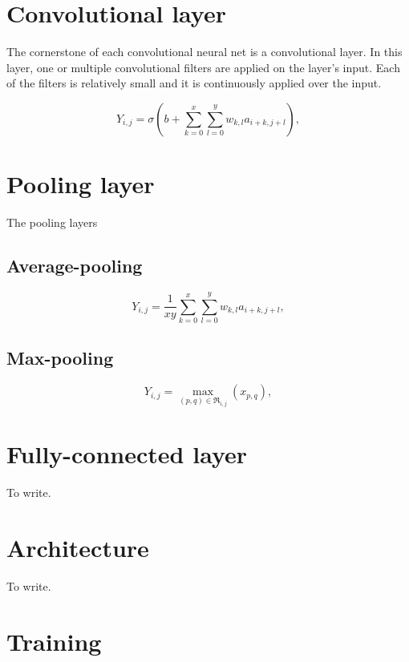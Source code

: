 \documentclass[twoside]{ctuthesis}
\theoremstyle{plain}
\theoremstyle{definition}
\theoremstyle{note}
\begin{document}
\section{Convolutional layer}
The cornerstone of each convolutional neural net is a convolutional layer. In this layer, 
one or multiple convolutional filters are applied on the layer's input.  Each of the filters
is relatively small and it is continuously applied over the input. 

\begin{equation} 
	Y_{i,j}=\sigma(b+\sum_{k=0}^{x}\sum_{l=0}^{y}w_{k,l}a_{i+k,j+l}),
\end{equation} 

\section{Pooling layer}
The pooling layers 

\subsection{Average-pooling}
\begin{equation} 
	Y_{i,j}=\frac{1}{xy}\sum_{k=0}^{x}\sum_{l=0}^{y}w_{k,l}a_{i+k,j+l},
\end{equation} 


\subsection{Max-pooling}

\begin{equation} 
	Y_{i,j} = \max_{(p,q)\in{\Re_{i,j}}}(x_{p,q}),
\end{equation} 


\section{Fully-connected layer}
To write.


\section{Architecture}
To write.


\section{Training}

\end{document}
